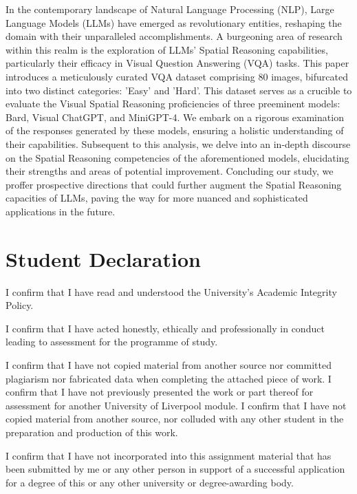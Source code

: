 \documentclass[twocolumn,11pt]{report}
\begin{document}
In the contemporary landscape of Natural Language Processing (NLP), Large Language Models (LLMs) have emerged as revolutionary entities, reshaping the domain with their unparalleled accomplishments. A burgeoning area of research within this realm is the exploration of LLMs' Spatial Reasoning capabilities, particularly their efficacy in Visual Question Answering (VQA) tasks. This paper introduces a meticulously curated VQA dataset comprising 80 images, bifurcated into two distinct categories: 'Easy' and 'Hard'. This dataset serves as a crucible to evaluate the Visual Spatial Reasoning proficiencies of three preeminent models: Bard, Visual ChatGPT, and MiniGPT-4. We embark on a rigorous examination of the responses generated by these models, ensuring a holistic understanding of their capabilities. Subsequent to this analysis, we delve into an in-depth discourse on the Spatial Reasoning competencies of the aforementioned models, elucidating their strengths and areas of potential improvement. Concluding our study, we proffer prospective directions that could further augment the Spatial Reasoning capacities of LLMs, paving the way for more nuanced and sophisticated applications in the future.

\newpage



\chapter*{\center Student Declaration} 

I confirm that I have read and understood the University's Academic Integrity Policy.

I confirm that I have acted honestly, ethically and professionally in conduct leading
to assessment for the programme of study.  

I confirm that I have not copied material from another source nor committed plagiarism
nor fabricated data when completing the attached piece of work.  I confirm that I have 
not previously presented the work or part thereof for assessment for another University
of Liverpool module.  I confirm that I have not copied material from another source, nor
colluded with any other student in the preparation and production of this work.  

I confirm that I have not incorporated into this assignment material that has been 
submitted by me or any other person in support of a successful application for a 
degree of this or any other university or degree-awarding body.  
\end{document}
